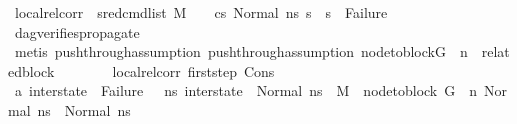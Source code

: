 \begin{isabellebody}
\ local{\isacharunderscore}{\kern0pt}rel{\isacharunderscore}{\kern0pt}corr{\isacharcolon}{\kern0pt}\ {\isachardoublequoteopen}{\isacharparenleft}{\kern0pt}{\isasymAnd}\ s{}{\isacharprime}{\kern0pt}{\isachardot}{\kern0pt}{\isacharparenleft}{\kern0pt}{\isacharparenleft}{\kern0pt}red{\isacharunderscore}{\kern0pt}cmd{\isacharunderscore}{\kern0pt}list\ M\ {\isasymLambda}\ {\isasymGamma}\ {\isasymOmega}\ {\isacharparenleft}{\kern0pt}cs{}{\isacharparenright}{\kern0pt}\ {\isacharparenleft}{\kern0pt}Normal\ ns{}{\isacharparenright}{\kern0pt}\ s{}{\isacharprime}{\kern0pt}{\isacharparenright}{\kern0pt}\ {\isasymLongrightarrow}\ {\isacharparenleft}{\kern0pt}s{}{\isacharprime}{\kern0pt}\ {\isasymnoteq}\ Failure{\isacharparenright}{\kern0pt}{\isacharparenright}{\kern0pt}{\isacharparenright}{\kern0pt}{\isachardoublequoteclose}\isanewline
\ \ \ \ \ \ \ \ \isamarkupfalse%
\ dag{\isacharunderscore}{\kern0pt}verifies{\isacharunderscore}{\kern0pt}propagate{\isacharunderscore}{\kern0pt}{}\ \isanewline
\ \ \ \ \ \ \ \ \isamarkupfalse%
\ {\isacharparenleft}{\kern0pt}metis\ push{\isacharunderscore}{\kern0pt}through{\isacharunderscore}{\kern0pt}assumption{}\ push{\isacharunderscore}{\kern0pt}through{\isacharunderscore}{\kern0pt}assumption{}\ {\isacartoucheopen}node{\isacharunderscore}{\kern0pt}to{\isacharunderscore}{\kern0pt}block{\isacharparenleft}{\kern0pt}G{\isacharparenright}{\kern0pt}\ {\isacharbang}{\kern0pt}\ n\ {\isacharequal}{\kern0pt}\ related{\isacharunderscore}{\kern0pt}block{\isacartoucheclose}{\isacharparenright}{\kern0pt}\isanewline
\isanewline
\ \ \ \ \ \ \isamarkupfalse%
\ local{\isacharunderscore}{\kern0pt}rel{\isacharunderscore}{\kern0pt}corr\ first{\isacharunderscore}{\kern0pt}step\ Cons\isanewline
\ \ \ \ \ \ \isamarkupfalse%
\ a{}{\isacharcolon}{\kern0pt}\ {\isachardoublequoteopen}{\isacharparenleft}{\kern0pt}inter{\isacharunderscore}{\kern0pt}state\ {\isasymnoteq}\ Failure\ \ {\isasymand}\ {\isacharparenleft}{\kern0pt}{\isasymforall}ns{}{\isacharprime}{\kern0pt}{\isachardot}{\kern0pt}\ inter{\isacharunderscore}{\kern0pt}state\ {\isacharequal}{\kern0pt}\ Normal\ ns{}{\isacharprime}{\kern0pt}\ {\isasymlongrightarrow}\ {\isacharparenleft}{\kern0pt}M{\isacharcomma}{\kern0pt}{\isasymLambda}{\isacharcomma}{\kern0pt}{\isasymGamma}{\isacharcomma}{\kern0pt}{\isasymOmega}\ {\isasymturnstile}\ {\isasymlangle}{\isacharparenleft}{\kern0pt}node{\isacharunderscore}{\kern0pt}to{\isacharunderscore}{\kern0pt}block\ G\ {\isacharbang}{\kern0pt}\ n{\isacharparenright}{\kern0pt}{\isacharcomma}{\kern0pt}\ Normal\ ns{}{\isasymrangle}\ {\isacharbrackleft}{\kern0pt}{\isasymrightarrow}{\isacharbrackright}{\kern0pt}\ Normal\ ns{}{\isacharprime}{\kern0pt}{\isacharparenright}{\kern0pt}{\isacharparenright}{\kern0pt}{\isacharparenright}{\kern0pt}{\isachardoublequoteclose}\ \isanewline

\end{isabellebody}
